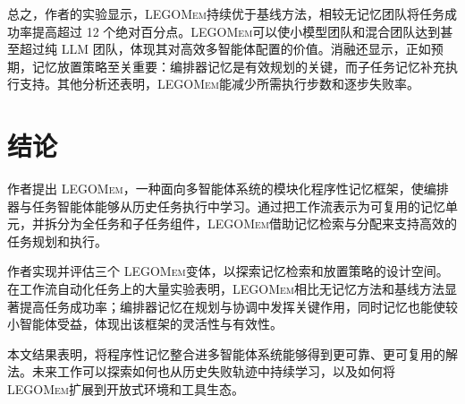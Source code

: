 \documentclass[10pt,twocolumn]{article}
\newcommand{\legomem}{\textsc{LEGOMem}}
\begin{document}
总之，作者的实验显示，\legomem 持续优于基线方法，相较无记忆团队将任务成功率提高超过 12 个绝对百分点。\legomem 可以使小模型团队和混合团队达到甚至超过纯 LLM 团队，体现其对高效多智能体配置的价值。消融还显示，正如预期，记忆放置策略至关重要：编排器记忆是有效规划的关键，而子任务记忆补充执行支持。其他分析还表明，\legomem 能减少所需执行步数和逐步失败率。

\section{结论}

作者提出 \legomem，一种面向多智能体系统的模块化程序性记忆框架，使编排器与任务智能体能够从历史任务执行中学习。通过把工作流表示为可复用的记忆单元，并拆分为全任务和子任务组件，\legomem 借助记忆检索与分配来支持高效的任务规划和执行。

作者实现并评估三个 \legomem 变体，以探索记忆检索和放置策略的设计空间。在工作流自动化任务上的大量实验表明，\legomem 相比无记忆方法和基线方法显著提高任务成功率；编排器记忆在规划与协调中发挥关键作用，同时记忆也能使较小智能体受益，体现出该框架的灵活性与有效性。

本文结果表明，将程序性记忆整合进多智能体系统能够得到更可靠、更可复用的解法。未来工作可以探索如何也从历史失败轨迹中持续学习，以及如何将 \legomem 扩展到开放式环境和工具生态。



\end{document}
